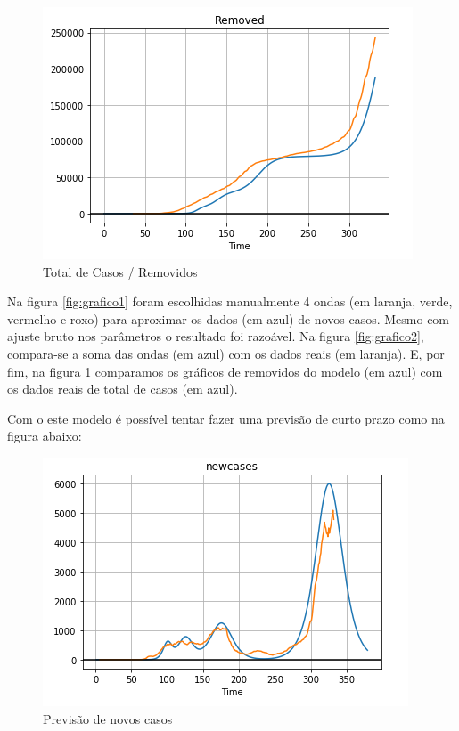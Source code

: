 \documentclass{article}
\begin{document}
\begin{figure}[H]
    \centering
    \includegraphics[width=0.8\linewidth]{grafico3.png}
    \caption{Total de Casos / Removidos}
    \label{fig:grafico3}
\end{figure}

Na figura \ref{fig:grafico1} foram escolhidas manualmente 4 ondas (em laranja, verde, vermelho e roxo) para aproximar os dados (em azul) de novos casos. Mesmo com ajuste bruto nos parâmetros o resultado foi razoável. Na figura \ref{fig:grafico2}, compara-se a soma das ondas (em azul) com os dados reais (em laranja). E, por fim, na figura \ref{fig:grafico3} comparamos os gráficos de removidos do modelo (em azul) com os dados reais de total de casos (em azul).

Com o este modelo é possível tentar fazer uma previsão de curto prazo como na figura abaixo:

\begin{figure}[H]
    \centering
    \includegraphics[width=0.8\linewidth]{grafico4.png}
    \caption{Previsão de novos casos}
    \label{fig:grafico4}
\end{figure}
\end{document}
